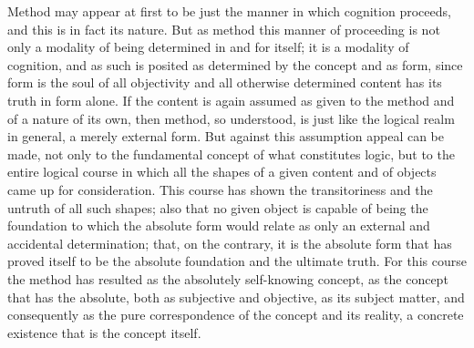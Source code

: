 Method may appear at first to be just
the manner in which cognition proceeds,
and this is in fact its nature.
But as method this manner of proceeding is
not only a modality of being determined in and for itself;
it is a modality of cognition,
and as such is posited as determined
by the concept and as form,
since form is the soul of all objectivity
and all otherwise determined content has its truth in form alone.
If the content is again assumed as given to the method
and of a nature of its own, then method, so understood,
is just like the logical realm in general,
a merely external form.
But against this assumption appeal can be made,
not only to the fundamental concept of what constitutes logic,
but to the entire logical course
in which all the shapes of a given content
and of objects came up for consideration.
This course has shown the transitoriness
and the untruth of all such shapes;
also that no given object is capable of being the foundation
to which the absolute form would relate
as only an external and accidental determination;
that, on the contrary, it is the absolute form
that has proved itself to be the absolute foundation
and the ultimate truth.
For this course the method has resulted as
the absolutely self-knowing concept,
as the concept that has the absolute,
both as subjective and objective,
as its subject matter,
and consequently as the pure correspondence
of the concept and its reality,
a concrete existence that is the concept itself.

